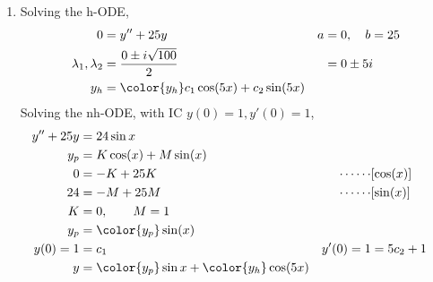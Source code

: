\begin{enumerate}
    \item Solving the h-ODE,
          \begin{align}
              0                        & = y'' + 25y                   &
              a                        & = 0, \quad b = 25               \\
              \lambda_{1}, \lambda_{2} & = \frac{0 \pm i\sqrt{100}}{2} &
                                       & = 0 \pm 5i                      \\
              y_{h}                    & = \color{y_h} c_{1}\cos(5x)
              + c_{2}\sin(5x)
          \end{align}
          Solving the nh-ODE, with IC $ y(0) = 1, y'(0) = 1 $,
          \begin{align}
              y'' + 25y    & = 24\sin x                                        \\
              y_{p}        & = K \cos(x) + M \sin(x)                           \\
              0            & = -K + 25K                                      &
              \cdots\cdots & [\cos(x)]                                         \\
              24           & = -M + 25M                                      &
              \cdots\cdots & [\sin(x)]                                         \\
              K            & = 0, \qquad M = 1                                 \\
              y_{p}        & = \color{y_p} \sin(x)                             \\
              y(0) = 1     & = c_{1}                                         &
              y'(0) = 1    & = 5c_{2} + 1                                      \\
              y            & = {\color{y_p} \sin x} + {\color{y_h} \cos(5x)}
          \end{align}

          \begin{figure}[H]
              \centering
          \end{figure}


\end{enumerate}
